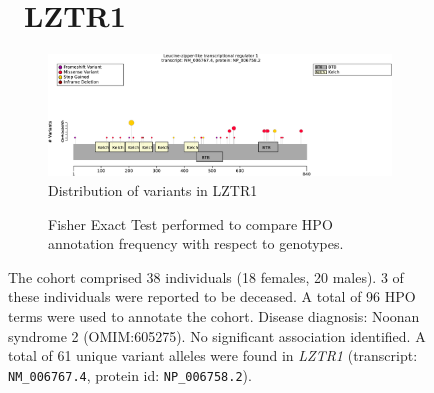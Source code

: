 \begin{figure}[htbp]
    \section*{ LZTR1}
    \centering
    \begin{subfigure}[b]{0.95\textwidth}
    \centering
    \includegraphics[width=\textwidth]{ img/LZTR1_protein_diagram.pdf} 
    \captionsetup{justification=raggedright,singlelinecheck=false}
    \caption{Distribution of variants in LZTR1}
    \end{subfigure}
    
    \vspace{2em}
    
    \begin{subfigure}[b]{0.95\textwidth}
    \centering
    \captionsetup{justification=raggedright,singlelinecheck=false}
    \caption{ Fisher Exact Test performed to compare HPO annotation frequency with respect to genotypes. }
    \end{subfigure}
    
    \vspace{2em}
    
    \caption{ The cohort comprised 38 individuals (18 females, 20 males). 3 of these individuals were reported to be deceased. A total of 96 HPO terms were used to annotate the cohort. Disease diagnosis: Noonan syndrome 2 (OMIM:605275). No significant association identified. A total of 61 unique variant alleles were found in \textit{LZTR1} (transcript: \texttt{NM\_006767.4}, protein id: \texttt{NP\_006758.2}).}
    \end{figure}
    